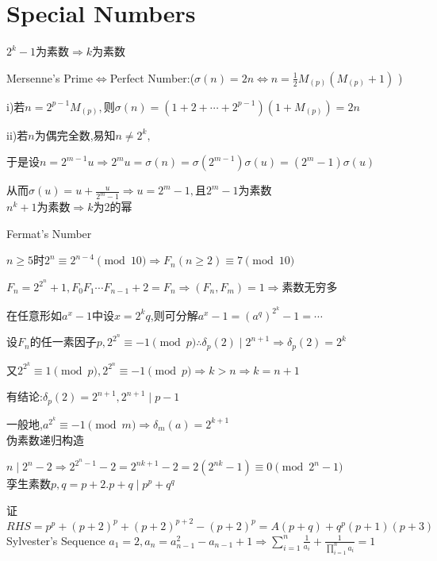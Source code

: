 
\section{Special Numbers}

$ 2^k-1$为素数$ \Rightarrow k$为素数 

Mersenne's Prime$ \Leftrightarrow $Perfect Number:($ \sigma(n)=2n \Leftrightarrow n=\frac{1}{2}M_{(p)}(M_{(p)}+1)$ )

i)若$ n=2^{p-1}M_{(p)},$则$ \sigma(n)=(1+2+\cdots+2^{p-1})(1+M_{(p)})=2n$

ii)若$ n$为偶完全数,易知$ n\ne 2^k,$

于是设$ n=2^{m-1}u\Rightarrow 2^mu=\sigma(n)=\sigma(2^{m-1})\sigma(u)=(2^m-1)\sigma(u)$

从而$ \sigma(u)=u+\frac{u}{2^m-1}\Rightarrow u=2^m-1,$且$ 2^m-1$为素数
\\

$ n^k+1$为素数$ \Rightarrow k$为2的幂

Fermat's Number

$ n\ge 5$时$ 2^n\equiv 2^{n-4} \pmod 10\Rightarrow F_n(n\ge 2)\equiv 7 \pmod 10$

$F_n=2^{2^n}+1,F_0F_1\cdots F_{n-1}+2=F_n\Rightarrow (F_n,F_m)=1 \Rightarrow $素数无穷多

在任意形如$ a^x-1$中设$ x=2^kq$,则可分解$ a^x-1=(a^q)^{2^k}-1=\cdots$

设$ F_n$的任一素因子$ p,2^{2^n}\equiv -1 \pmod p \therefore \delta_p(2)\mid 2^{n+1}\Rightarrow \delta_p(2)=2^k$

又$ 2^{2^k}\equiv 1 \pmod p,2^{2^n}\equiv -1 \pmod p\Rightarrow k>n\Rightarrow k=n+1$

有结论:$ \delta_p(2)=2^{n+1},2^{n+1}\mid p-1$

一般地,$ a^{2^k}\equiv -1 \pmod m\Rightarrow \delta_m(a)=2^{k+1}$
\\

伪素数递归构造

$ n \mid 2^n-2\Rightarrow 2^{2^n-1}-2=2^{nk+1}-2=2(2^{nk}-1)\equiv0\pmod{2^n-1}$
\\

孪生素数$ p,q=p+2.p+q\mid p^p+q^q$ 

证$RHS =p^p+(p+2)^p+(p+2)^{p+2}-(p+2)^p=A(p+q)+q^p(p+1)(p+3)$
\\

Sylvester's Sequence
$    a_1=2,a_n=a_{n-1}^2-a_{n-1}+1\Rightarrow \sum_{i=1}^{n}{\frac{1}{a_i}}+\frac{1}{\prod_{i=1}^{n}{a_i}}=1 $ 

